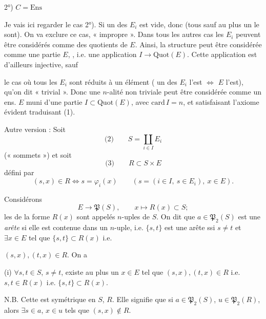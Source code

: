 \documentclass[11pt,a4paper]{article}
\begin{document}
2°) $C = \mathrm{Ens}$

 Je vais ici regarder le cas 2°). Si un des $E_i$ est vide, donc  (tous sauf au plus un le sont). On va exclure ce cas,  « \struck{\ill{}} impropre ». Dans tous les autres cas les $E_i$ peuvent être considérés comme des quotients de $E$. Ainsi, la structure peut être considérée comme une partie  $E$,  , i.e. une application $I\to\mathrm{Quot}(E)$. Cette application est d'ailleurs injective, sauf  

le cas où tous les $E_i$ sont réduits à un élément \struck{\ill{}} (\struck{\ill{}} un des $E_i$ l'est $\Leftrightarrow$ $E$ l'est), qu'on dit « trivial ». Donc une $n$-alité non triviale peut être considérée comme un ens. $E$ muni d'une partie $I\subset\mathrm{Quot}(E)$, avec $\mathrm{card}\,I = n$, et satisfaisant l'axiome évident traduisant (1).

Autre version : Soit \struck{\ill{}}
\[
\text{(2)}\qquad S = \coprod_{i\in I} E_i
\]
(« sommets »)
et \struck{\ill{}} soit
\[
\text{(3)}\qquad R\subset S\times E
\]
défini par
\[
(s, x)\in R \iff s = \varphi_i(x) \qquad (s = (i\in I,\ s\in E_i),\ x\in E).
\]

Considérons
\[
E \longrightarrow \mathfrak P(S), \qquad x \longmapsto R(x)\subset S ;
\]
les  de  la forme $R(x)$ sont appelés $n$-uples de $S$. On dit que  $a\in\mathfrak P_2(S)$ est une \emph{arête} si elle est contenue dans un $n$-uple, i.e. $\{s,t\}$ est une arête ssi $s\neq t$ et $\exists x\in E$ tel que $\{s,t\}\subset R(x)$ i.e.

$(s,x), (t,x)\in R$. On a

(i) $\forall s,t\in S$, $s\neq t$, existe au plus un $x\in E$ tel que $(s,x),(t,x)\in R$ i.e. $s,t\in R(x)$ i.e. $\{s,t\}\subset R(x)$.



N.B. Cette   est symétrique en $S$, $R$. Elle signifie que si $a\in\mathfrak P_2(S)$, $u\in\mathfrak P_2(R)$, alors $\exists s\in a$, $x\in u$ tels que $(s,x)\notin R$.
\end{document}

